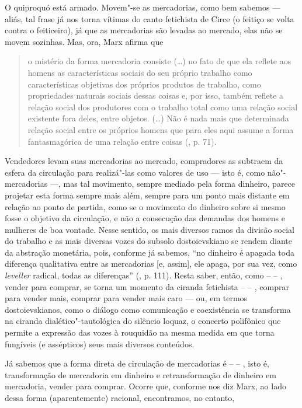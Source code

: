 O quiproquó está armado. Movem"-se as mercadorias, como bem sabemos ---
aliás, tal frase já nos torna vítimas do canto fetichista de Circe (o
feitiço se volta contra o feiticeiro), já que as mercadorias são levadas
ao mercado, elas não se movem sozinhas. Mas, ora, Marx afirma que

\begin{quote}
o mistério da forma mercadoria consiste (\ldots) no fato de que ela reflete
aos homens as características sociais do seu próprio trabalho como
características objetivas dos próprios produtos de trabalho, como
propriedades naturais sociais dessas coisas e, por isso, também reflete
a relação social dos produtores com o trabalho total como uma relação
social existente fora deles, entre objetos. (\ldots) Não é nada mais que
determinada relação social entre os próprios homens que para eles aqui
assume a forma fantasmagórica de uma relação entre coisas (, p. 71).
\end{quote}

Vendedores levam suas mercadorias ao mercado, compradores as subtraem da
esfera da circulação para realizá"-las como valores de uso --- isto é,
como não"-mercadorias ---, mas tal movimento, sempre mediado pela forma
dinheiro, parece projetar esta forma sempre mais além, sempre para um
ponto mais distante em relação ao ponto de partida, como se o movimento
do dinheiro sobre si mesmo fosse o objetivo da circulação, e não a
consecução das demandas dos homens e mulheres de boa vontade. Nesse
sentido, os mais diversos ramos da divisão social do trabalho e as mais
diversas vozes do subsolo dostoievskiano se rendem diante da abstração
monetária, pois, conforme já sabemos, ``no dinheiro é apagada toda
diferença qualitativa entre as mercadorias {[}e, assim{]}, ele apaga,
por sua vez, como \emph{leveller} radical, todas as diferenças'' (,
p. 111). Resta saber, então, como  --  -- , vender para comprar, se
torna um momento da ciranda fetichista  --  -- , comprar para vender
mais, comprar para vender mais caro --- ou, em termos dostoievskianos,
como o diálogo como comunicação e coexistência se transforma na ciranda
dialético"-tautológica do silêncio loquaz, o concerto polifônico que
permite a expressão das vozes à rouquidão na mesma medida em que torna
fungíveis (e assépticos) seus mais diversos conteúdos.

Já sabemos que a forma direta de circulação de mercadorias é  --  --
, isto é, transformação de mercadoria em dinheiro e retransformação de
dinheiro em mercadoria, vender para comprar. Ocorre que, conforme nos
diz Marx, ao lado dessa forma (aparentemente) racional, encontramos, no
entanto,

